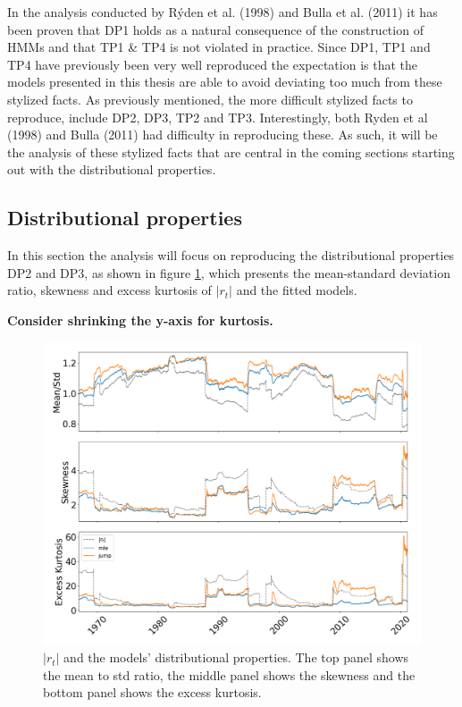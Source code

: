 In the analysis conducted by Rýden et al. (1998) and Bulla et al. (2011) it has been proven that DP1 holds as a natural consequence of the construction of HMMs and that TP1 \& TP4 is not violated in practice. Since DP1, TP1 and TP4 have previously been very well reproduced the expectation is that the models presented in this thesis are able to avoid deviating too much from these stylized facts. As previously mentioned, the more difficult stylized facts to reproduce, include DP2, DP3, TP2 and TP3. Interestingly, both Ryden et al (1998) and Bulla (2011) had difficulty in reproducing these. As such, it will be the analysis of these stylized facts that are central in the coming sections starting out with the distributional properties.

\subsection{Distributional properties}
\label{Sec: Distributional properties}

In this section the analysis will focus on reproducing the distributional properties DP2 and DP3, as shown in figure \ref{fig:stylized_facts_moments_bulla_abs}, which presents the mean-standard deviation ratio, skewness and excess kurtosis of $|r_t|$ and the fitted models.

\textbf{Consider shrinking the y-axis for kurtosis.}
\begin{figure}[H] 
    \centering
    \includegraphics[width=1 \textwidth, height=0.4\textheight]{analysis/stylized_facts/images/moments_bulla_abs.png}
    \caption[$|r_t|$ and the models' distributional properties]{$|r_t|$ and the models' distributional properties. The top panel shows the mean to std ratio, the middle panel shows the skewness and the bottom panel shows the excess kurtosis.}
    \label{fig:stylized_facts_moments_bulla_abs} 
\end{figure}

